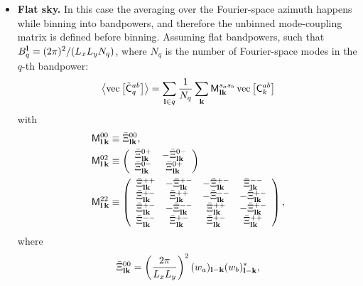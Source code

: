 \documentclass[a4paper,11pt]{article}
\begin{document}
\begin{itemize}
        \item {\bf Flat sky.} In this case the averaging over the Fourier-space azimuth happens while binning into bandpowers, and therefore the unbinned mode-coupling matrix is defined before binning. Assuming flat bandpowers, such that $B_q^{\bf l}=(2\pi)^2/(L_xL_yN_q)$, where $N_q$ is the number of Fourier-space modes in the $q$-th bandpower:
        \begin{equation}
          \left\langle{\rm vec}\left[\tilde{\sf C}^{ab}_q\right]\right\rangle=\sum_{{\bf l}\in q}\frac{1}{N_q} \sum_{\bf k}{\sf M}^{s_as_b}_{{\bf l}{\bf k}}\,{\rm vec}\left[{\sf C}^{ab}_k\right]
        \end{equation}
        with
        \begin{align}
          {\sf M}^{00}_{{\bf l}\,{\bf k}}&\equiv \bar{\Xi}^{00}_{{\bf l}{\bf k}},\\
          {\sf M}^{02}_{{\bf l}\,{\bf k}}&\equiv 
          \left(
          \begin{array}{cc}
            \bar{\Xi}^{0+}_{{\bf l}{\bf k}} & -\bar{\Xi}^{0-}_{{\bf l}{\bf k}} \\
            \bar{\Xi}^{0-}_{{\bf l}{\bf k}} &  \bar{\Xi}^{0+}_{{\bf l}{\bf k}}
          \end{array}\right)\\\label{eq:m22_flat}
          {\sf M}^{22}_{{\bf l}\,{\bf k}}&\equiv 
          \left(
          \begin{array}{cccc}
            \bar{\Xi}^{++}_{{\bf l}{\bf k}} & -\bar{\Xi}^{+-}_{{\bf l}{\bf k}} & -\bar{\Xi}^{+-}_{{\bf l}{\bf k}} &  \bar{\Xi}^{--}_{{\bf l}{\bf k}} \\
            \bar{\Xi}^{+-}_{{\bf l}{\bf k}} &  \bar{\Xi}^{++}_{{\bf l}{\bf k}} & -\bar{\Xi}^{--}_{{\bf l}{\bf k}} & -\bar{\Xi}^{+-}_{{\bf l}{\bf k}} \\
            \bar{\Xi}^{+-}_{{\bf l}{\bf k}} & -\bar{\Xi}^{--}_{{\bf l}{\bf k}} &  \bar{\Xi}^{++}_{{\bf l}{\bf k}} & -\bar{\Xi}^{+-}_{{\bf l}{\bf k}} \\
            \bar{\Xi}^{--}_{{\bf l}{\bf k}} &  \bar{\Xi}^{+-}_{{\bf l}{\bf k}} &  \bar{\Xi}^{+-}_{{\bf l}{\bf k}} & \bar{\Xi}^{++}_{{\bf l}{\bf k}}
          \end{array}\right),
        \end{align}
        where
        \begin{align}\label{eq:coeff_mcm_flat}
          &\bar{\Xi}^{00}_{{\bf l}{\bf k}}=\left(\frac{2\pi}{L_xL_y}\right)^2 (w_a)_{{\bf l}-{\bf k}}(w_b)^*_{{\bf l}-{\bf k}},\\

\end{align}
\end{itemize}
\end{document}
